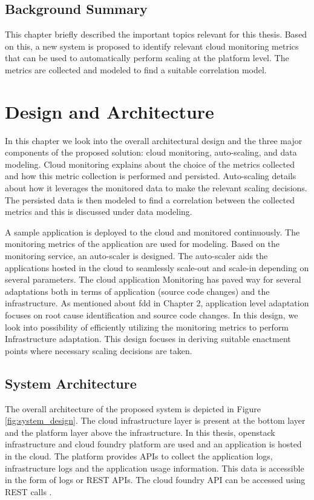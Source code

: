 \documentclass[article,type=msc,colorback,12pt,accentcolor=tud8b,table]{tudthesis}
\begin{document}
\subsection{Background Summary}
This chapter briefly described the important topics relevant for this thesis. Based on this, a new system is proposed to identify relevant cloud monitoring metrics that can be used to automatically perform scaling at the platform level. The metrics are collected and modeled to find a suitable correlation model.
	
 \cleardoublepage

 \hfill 
 \section{Design and Architecture}	
 \hfill \break
 
 In this chapter we look into the overall architectural design and the three major components of the proposed solution: cloud monitoring, auto-scaling, and data modeling. Cloud monitoring explains about the choice of the metrics collected and how this metric collection is performed and persisted. Auto-scaling details about how it leverages the monitored data to make the relevant scaling decisions. The persisted data is then modeled to find a correlation between the collected metrics and this is discussed under data modeling. 
 
 	A sample application is deployed to the cloud and monitored continuously. The monitoring metrics of the application are used for modeling. Based on the monitoring service, an auto-scaler is designed. The auto-scaler aids the applications hosted in the cloud to seamlessly scale-out and scale-in depending on several parameters. The cloud application Monitoring has paved way for several adaptations both in terms of application (source code changes) and the infrastructure. As mentioned about \gls{fdd}  in Chapter 2, application level adaptation focuses on root cause identification and source code changes. In this design, we look into possibility of efficiently utilizing the monitoring metrics to perform Infrastructure adaptation.  This design focuses in deriving suitable enactment points where necessary scaling decisions are taken. 
 
\subsection{System Architecture} 

	The overall architecture of the proposed system is depicted in Figure \ref{fig:system_design}. The cloud infrastructure layer is present at the bottom layer and the platform layer above the infrastructure. In this thesis, openstack infrastructure and cloud foundry platform are used and an application is hosted in the cloud. The platform provides APIs to collect the application logs, infrastructure logs and the application usage information. This data is accessible in the form of logs or REST APIs. The cloud foundry API can be accessed using REST calls \cite{cf_summary}. 
	
\end{document}
